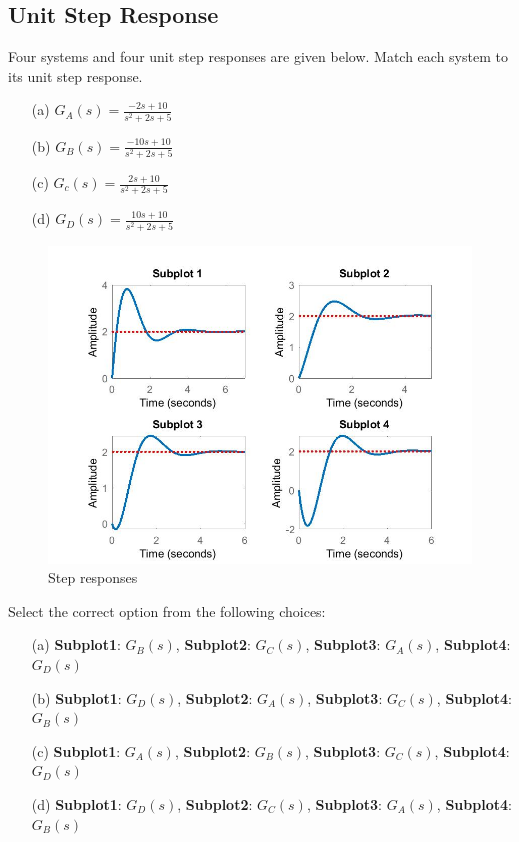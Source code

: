 \documentclass[12pt]{article}
\begin{document}
\subsection{Unit Step Response}

Four systems and four unit step responses are given below. Match each system to its unit step response.

\begin{itemize}
    \item[(a)] \(G_A(s) = \frac{-2s+10}{s^2+2s+5}\)
    \item[(b)] \(G_B(s) = \frac{-10s+10}{s^2+2s+5}\)
    \item[(c)] \(G_c(s) = \frac{2s+10}{s^2+2s+5} \)
    \item[(d)] \(G_D(s) = \frac{10s+10}{s^2+2s+5}\)
\end{itemize}
\begin{figure}[h]
\centering
\includegraphics[width=\textwidth]{figs/3.13.jpg}
\caption{Step responses}
\end{figure}
Select the correct option from the following choices:
\begin{enumerate}
    \item [(a)] \textbf{Subplot1}: \(G_B(s)\), \textbf{Subplot2}: \(G_C(s)\), \textbf{Subplot3}: \(G_A(s)\), \textbf{Subplot4}: \(G_D(s)\) 
    \item [(b)] \textbf{Subplot1}: \(G_D(s)\), \textbf{Subplot2}: \(G_A(s)\), \textbf{Subplot3}: \(G_C(s)\), \textbf{Subplot4}: \(G_B(s)\) 
    \item [(c)] \textbf{Subplot1}: \(G_A(s)\), \textbf{Subplot2}: \(G_B(s)\), \textbf{Subplot3}: \(G_C(s)\), \textbf{Subplot4}: \(G_D(s)\) 
    \item [(d)] \textbf{Subplot1}: \(G_D(s)\), \textbf{Subplot2}: \(G_C(s)\), \textbf{Subplot3}: \(G_A(s)\), \textbf{Subplot4}: \(G_B(s)\) 
\end{enumerate}
\end{document}
